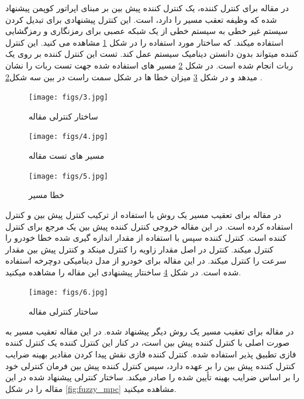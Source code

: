 \documentclass[12pt,a4paper]{report}
\begin{document}
	در مقاله \cite{wang2022data} برای کنترل کننده، یک کنترل کننده پیش بین بر مبنای اپراتور کوپمن پیشنهاد شده که وظیفه تعقب مسیر را دارد، است. این کنترل پیشنهادی برای تبدیل کردن سیستم غیر خطی به سیستم خطی از یک شبکه عصبی برای رمزنگاری و رمزگشایی استفاده میکند. که ساختار مورد استفاده را در شکل \ref{fig:data} مشاهده می کنید. این کنترل کننده میتواند بدون دانستن دینامیک سیستم عمل کند. تست این کنترل کننده بر روی یک ربات انجام شده است. در شکل \ref{fig:data_path} مسیر های استفاده شده جهت تست ربات را نشان میدهد و در شکل   \ref{fig:data_res} میزان خطا ها در شکل سمت راست در بین سه شکل\ref{fig:data_path} . \\
	\begin{figure}
		\texttt{[image: figs/3.jpg]}
		\caption{ساختار کنترلی مقاله\cite{wang2022data}}
		\label{fig:data}
	\end{figure}
	\begin{figure}
		\texttt{[image: figs/4.jpg]}
		\caption{مسیر های تست مقاله \cite{wang2022data}}
		\label{fig:data_path}
	\end{figure}
	\begin{figure}
		\texttt{[image: figs/5.jpg]}
		\caption{خطا مسیر}
		\label{fig:data_res}
	\end{figure}
	
	در مقاله \cite{tang2020improved} برای تعقیب مسیر یک روش با استفاده از ترکیب کنترل پیش بین و کنترل  استفاده کرده است. در این مقاله خروجی کنترل کننده پیش بین یک مرجع برای کنترل کننده  است. کنترل کننده  سپس با استفاده از مقدار اندازه گیری شده خطا خودرو را کنترل میکند. کنترل  در اصل مقدار زاویه  را کنترل مینکد و کنترل پیش بین مقدار سرعت  را کنترل میکند. در این مقاله برای خودرو از مدل دینامیکی دوچرخه استفاده شده است. در شکل \ref{fig:fuzzy_pid} ساخنتار پیشنهادی این مقاله را مشاهده میکنید.\\
	\begin{figure}
		\texttt{[image: figs/6.jpg]}
		\caption{ساختار کنترلی مقاله \cite{tang2020improved}}
		\label{fig:fuzzy_pid}
	\end{figure}
	
	در مقاله \cite{wang2019path} برای تعقیب مسیر یک روش دیگر پیشنهاد شده. در این مقاله تعقیب مسیر به صورت اصلی با کنترل کننده پیش بین است، در کنار این کنترل کننده یک کنترل کننده فازی تطبیق پذیر استفاده شده. کنترل کننده فازی نقش پیدا کردن مقادیر بهینه ضرایب کنترل کننده پیش بین را بر عهده دارد، سپس کنترل کننده پیش بین فرمان کنترلی خود را بر اساس ضرایب بهینه تأیین شده را صادر میکند. ساختار کنترلی پیشنهاد شده در این مقاله را در شکل \ref{fig:fuzzy_mpc} مشاهده میکنید.\\
	
\end{document}
